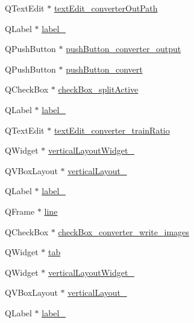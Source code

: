 \begin{DoxyCompactItemize}
\item 
Q\+Text\+Edit $\ast$ \hyperlink{class_ui___main_window_a55ecdb78cfe88614a3b9fd8d57999f99}{text\+Edit\+\_\+converter\+Out\+Path}
\item 
Q\+Label $\ast$ \hyperlink{class_ui___main_window_a4f12a71b4a2fb6f85df2300d83b5ed3e}{label\+\_}
\item 
Q\+Push\+Button $\ast$ \hyperlink{class_ui___main_window_aed16e1c25540482fc249643ab6b2fc39}{push\+Button\+\_\+converter\+\_\+output}
\item 
Q\+Push\+Button $\ast$ \hyperlink{class_ui___main_window_a2c039d057072eb5f23b73bcc563d013c}{push\+Button\+\_\+convert}
\item 
Q\+Check\+Box $\ast$ \hyperlink{class_ui___main_window_aa583f6afdfedb19f513be741d3ad6586}{check\+Box\+\_\+split\+Active}
\item 
Q\+Label $\ast$ \hyperlink{class_ui___main_window_a9dc4dba26b83e0c94aa566e1c564420b}{label\+\_}
\item 
Q\+Text\+Edit $\ast$ \hyperlink{class_ui___main_window_a4aa4f08c766c8fe7aac1a8de04833346}{text\+Edit\+\_\+converter\+\_\+train\+Ratio}
\item 
Q\+Widget $\ast$ \hyperlink{class_ui___main_window_a7d66eb6b96e63a935eebc16840aee27e}{vertical\+Layout\+Widget\+\_}
\item 
Q\+V\+Box\+Layout $\ast$ \hyperlink{class_ui___main_window_ab69a0ed5b8ea1148c5dda9b89cdfbba4}{vertical\+Layout\+\_}
\item 
Q\+Label $\ast$ \hyperlink{class_ui___main_window_aa2621565827195e88436fb54220bb48d}{label\+\_}
\item 
Q\+Frame $\ast$ \hyperlink{class_ui___main_window_a16e802a7ebd4beb9d8aba858565e51b3}{line}
\item 
Q\+Check\+Box $\ast$ \hyperlink{class_ui___main_window_a378ba94bf33af77fd61b6ecf41f1ece1}{check\+Box\+\_\+converter\+\_\+write\+\_\+images}
\item 
Q\+Widget $\ast$ \hyperlink{class_ui___main_window_a3efc28c664e9f5115095aafbbc5ac6bc}{tab}
\item 
Q\+Widget $\ast$ \hyperlink{class_ui___main_window_a0b75a8b09a85cd440f769d415f455b39}{vertical\+Layout\+Widget\+\_}
\item 
Q\+V\+Box\+Layout $\ast$ \hyperlink{class_ui___main_window_a9022dbb281d9d46048c96ca1041e0905}{vertical\+Layout\+\_}
\item 
Q\+Label $\ast$ \hyperlink{class_ui___main_window_a9125c3f58951f983d461686ccaabb468}{label\+\_}
\item 

\end{DoxyCompactItemize}
